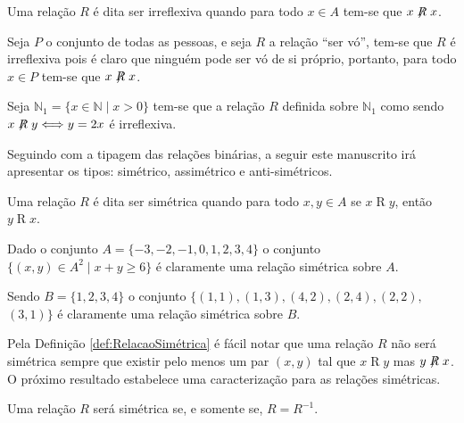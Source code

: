 \begin{definicao}\label{def:RelacaoIrreflexiva}
	Uma relação $R$ é dita ser irreflexiva quando para todo $x \in A$ tem-se que $x \centernot{R} x$.
\end{definicao}

\begin{exemplo}
	Seja $P$ o conjunto de todas as pessoas, e seja $R$ a relação ``ser vó'', tem-se que $R$ é irreflexiva pois é claro que ninguém pode ser vó de si próprio, portanto, para todo $x \in P$ tem-se que $x \centernot{R} x$.
\end{exemplo}

\begin{exemplo}
	Seja $\mathbb{N}_1 = \{x \in \mathbb{N} \mid x > 0\}$ tem-se que a relação $R$ definida sobre $\mathbb{N}_1$ como sendo $x \centernot{R} y \Longleftrightarrow y = 2x$ é irreflexiva.
\end{exemplo}

Seguindo com a tipagem das relações binárias,  a seguir este manuscrito irá apresentar os tipos: simétrico, assimétrico e anti-simétricos.

\begin{definicao}\label{def:RelacaoSimétrica}
	Uma relação $R$ é dita ser simétrica quando para todo $x, y \in A$ se $x \mathrel{R} y$, então $y \mathrel{R} x$.
\end{definicao}

\begin{exemplo}
	Dado o conjunto $A = \{-3, -2, -1, 0, 1, 2, 3, 4\}$ o conjunto $\{(x, y) \in A^2 \mid x + y \geq 6\}$ é claramente uma relação simétrica sobre $A$.
\end{exemplo}

\begin{exemplo}
	Sendo $B = \{1, 2, 3, 4\}$ o conjunto $\{(1, 1), (1, 3), (4, 2), (2, 4), (2, 2),$  $(3, 1)\}$ é claramente uma relação simétrica sobre $B$.
\end{exemplo}

Pela Definição \ref{def:RelacaoSimétrica} é fácil notar que uma relação $R$ não será simétrica sempre que existir pelo menos um par $(x, y)$ tal que $x \mathrel{R} y$ mas $y \centernot{R} x$. O próximo resultado estabelece uma caracterização para as relações simétricas.

\begin{teorema}\label{teo:CaracterizacaoRelacaoSimetricas}
	Uma relação $R$ será simétrica se, e somente se, $R = R^{-1}$.
\end{teorema}

